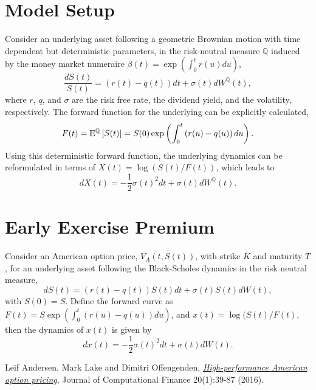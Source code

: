 \documentclass[12pt]{article}
\begin{document}
  \section{Model Setup}

    Consider an underlying asset following a geometric Brownian motion with time dependent but deterministic
    parameters, in the risk-neutral measure $\mathbb{Q}$ induced by the money market numeraire $\beta(t)=
    \exp\left(\int_0^tr(u)du\right)$,
    \begin{equation}
      \frac{dS(t)}{S(t)}=\left(r(t)-q(t)\right)dt+\sigma(t)dW^{\mathbb{Q}}(t),
    \end{equation}
    where $r$, $q$, and $\sigma$ are the risk free rate, the dividend yield, and the volatility, respectively.
    The forward function for the underlying can be explicitly calculated,
    \begin{equation}
      F(t)={\rm E}^{\mathbb{Q}}\left[S(t)\right]=S(0)\exp\left(\int_0^t\left(r(u)-q(u)\right)du\right).
    \end{equation}
    Using this deterministic forward function, the underlying dynamics can be reformulated in terms of
    $X(t)=\log\left(S(t)/F(t)\right)$, which leads to
    \begin{equation}
      dX(t) = -\frac{1}{2}\sigma(t)^2dt + \sigma(t)dW^{\mathbb{Q}}(t).
    \end{equation}



  \section{Early Exercise Premium}

    Consider an American option price, $V_A(t,S(t))$, with strike $K$ and maturity $T$, for an underlying
    asset following the Black-Scholes dynamics in the risk neutral measure,
    \begin{equation}
      dS(t) = (r(t)-q(t))S(t)dt + \sigma(t)S(t)dW(t),
    \end{equation}
    with $S(0)=S$. Define the forward curve as $F(t)=S\exp(\int_0^t(r(u)-q(u))du)$, and $x(t)=\log(S(t)/F(t)$,
    then the dynamics of $x(t)$ is given by
    \begin{equation}
      dx(t) = -\frac{1}{2}\sigma(t)^2dt + \sigma(t)dW(t).
    \end{equation}



\begin{thebibliography}{99}
    Leif Andersen, Mark Lake and Dimitri Offengenden,
    \href{https://www.risk.net/journal-of-computational-finance/2464632/high-performance-american-option-pricing}
    {\it High-performance American option pricing},
    Journal of Computational Finance 20(1):39-87 (2016).
\end{thebibliography}
\end{document}
